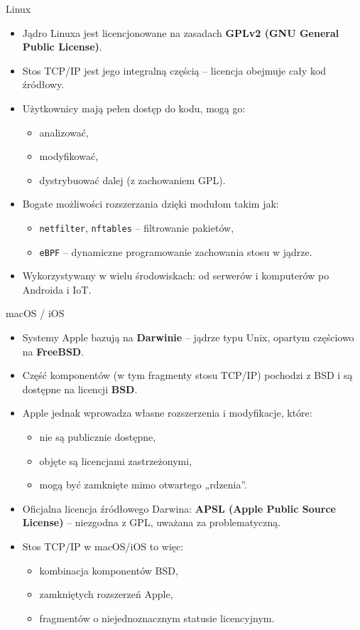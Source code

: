 \documentclass[aspectratio=169]{beamer}
\begin{document}
\begin{frame}{Linux}
  \begin{itemize}
    \item Jądro Linuxa jest licencjonowane na zasadach \textbf{GPLv2 (GNU General Public License)}.
    \item Stos TCP/IP jest jego integralną częścią – licencja obejmuje cały kod źródłowy.
    \item Użytkownicy mają pełen dostęp do kodu, mogą go:
    \begin{itemize}
      \item analizować,
      \item modyfikować,
      \item dystrybuować dalej (z zachowaniem GPL).
    \end{itemize}
    \item Bogate możliwości rozszerzania dzięki modułom takim jak:
    \begin{itemize}
      \item \texttt{netfilter}, \texttt{nftables} – filtrowanie pakietów,
      \item \texttt{eBPF} – dynamiczne programowanie zachowania stosu w jądrze.
    \end{itemize}
    \item Wykorzystywany w wielu środowiskach: od serwerów i komputerów po Androida i IoT.
  \end{itemize}
\end{frame}

\begin{frame}{macOS / iOS}
  \begin{itemize}
    \item Systemy Apple bazują na \textbf{Darwinie} – jądrze typu Unix, opartym częściowo na \textbf{FreeBSD}.
    \item Część komponentów (w tym fragmenty stosu TCP/IP) pochodzi z BSD i są dostępne na licencji \textbf{BSD}.
    \item Apple jednak wprowadza własne rozszerzenia i modyfikacje, które:
    \begin{itemize}
      \item nie są publicznie dostępne,
      \item objęte są licencjami zastrzeżonymi,
      \item mogą być zamknięte mimo otwartego „rdzenia”.
    \end{itemize}
    \item Oficjalna licencja źródłowego Darwina: \textbf{APSL (Apple Public Source License)} – niezgodna z GPL, uważana za problematyczną.
    \item Stos TCP/IP w macOS/iOS to więc:
    \begin{itemize}
      \item kombinacja komponentów BSD,
      \item zamkniętych rozszerzeń Apple,
      \item fragmentów o niejednoznacznym statusie licencyjnym.
    \end{itemize}
  \end{itemize}
\end{frame}
\end{document}

